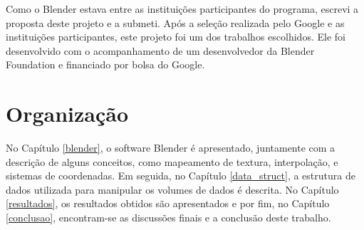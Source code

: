 Como o Blender estava entre as instituições participantes do programa, escrevi a proposta deste projeto e a submeti. Após a seleção realizada pelo Google e as instituições participantes, este projeto foi um dos trabalhos escolhidos. Ele foi desenvolvido com o acompanhamento de um desenvolvedor da Blender Foundation e financiado por bolsa do Google.

\section{Organizaç\~ao}

No Capítulo \ref{blender}, o software Blender é apresentado, juntamente com a descrição de alguns conceitos, como mapeamento de textura, interpolação, e sistemas de coordenadas. Em seguida, no Capítulo \ref{data_struct}, a estrutura de dados utilizada para manipular os volumes de dados é descrita. No Capítulo \ref{resultados}, os resultados obtidos são apresentados e por fim, no Capítulo \ref{conclusao}, encontram-se as discussões finais e a conclusão deste trabalho.
